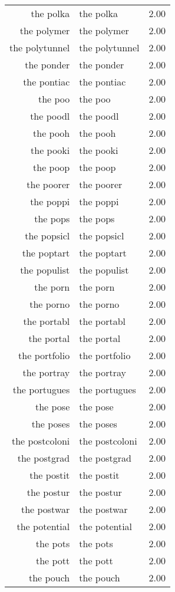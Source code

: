 \begin{table}[ht]
\begin{tabular}{rlr}
  the polka & the polka & 2.00 \\ 
  the polymer & the polymer & 2.00 \\ 
  the polytunnel & the polytunnel & 2.00 \\ 
  the ponder & the ponder & 2.00 \\ 
  the pontiac & the pontiac & 2.00 \\ 
  the poo & the poo & 2.00 \\ 
  the poodl & the poodl & 2.00 \\ 
  the pooh & the pooh & 2.00 \\ 
  the pooki & the pooki & 2.00 \\ 
  the poop & the poop & 2.00 \\ 
  the poorer & the poorer & 2.00 \\ 
  the poppi & the poppi & 2.00 \\ 
  the pops & the pops & 2.00 \\ 
  the popsicl & the popsicl & 2.00 \\ 
  the poptart & the poptart & 2.00 \\ 
  the populist & the populist & 2.00 \\ 
  the porn & the porn & 2.00 \\ 
  the porno & the porno & 2.00 \\ 
  the portabl & the portabl & 2.00 \\ 
  the portal & the portal & 2.00 \\ 
  the portfolio & the portfolio & 2.00 \\ 
  the portray & the portray & 2.00 \\ 
  the portugues & the portugues & 2.00 \\ 
  the pose & the pose & 2.00 \\ 
  the poses & the poses & 2.00 \\ 
  the postcoloni & the postcoloni & 2.00 \\ 
  the postgrad & the postgrad & 2.00 \\ 
  the postit & the postit & 2.00 \\ 
  the postur & the postur & 2.00 \\ 
  the postwar & the postwar & 2.00 \\ 
  the potential & the potential & 2.00 \\ 
  the pots & the pots & 2.00 \\ 
  the pott & the pott & 2.00 \\ 
  the pouch & the pouch & 2.00 \\ 

\end{tabular}
\end{table}
